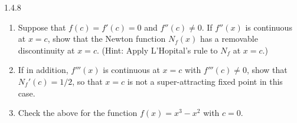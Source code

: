 \begin{problem}{1.4.8}
  \begin{enumerate}
    \item Suppose that $f(c) = f'(c) = 0$ and $f''(c) \neq 0$. If $f''(x)$ is continuous at $x = c$,
      show that the Newton function $N_f (x)$ has a removable discontinuity at $x = c$. (Hint:
      Apply L'Hopital's rule to $N_f$ at $x = c$.)
    \item If in addition, $f'''(x)$ is continuous at $x = c$ with $f'''(c) \neq 0$,
      show that $N_f'(c) = 1/2$, so that $x = c$ is not a super-attracting fixed point in this case.
    \item Check the above for the function $f(x) = x^3 - x^2$ with $c = 0$.
  \end{enumerate}
\end{problem}

